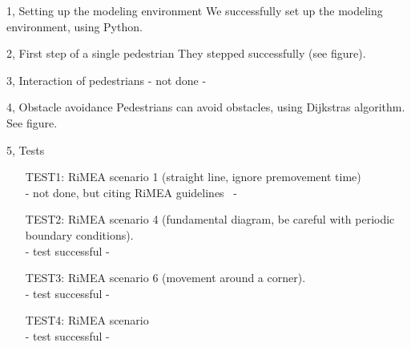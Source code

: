 \documentclass[10pt,a4paper]{article}
\begin{document}
\frontpage

\begin{task}{1, Setting up the modeling environment}
We successfully set up the modeling environment, using Python.
\end{task}

\begin{task}{2, First step of a single pedestrian}
They stepped successfully (see figure).
\end{task}

\begin{task}{3, Interaction of pedestrians}
- not done -
\end{task}
\begin{task}{4, Obstacle avoidance}
Pedestrians can avoid obstacles, using Dijkstras algorithm. See figure.
\end{task}
\begin{task}{5, Tests}
\begin{enumerate}
\item[TEST1:] RiMEA scenario 1 (straight line, ignore premovement time)\\
- not done, but citing RiMEA guidelines~\cite{rimea-2009} -
\item[TEST2:] RiMEA scenario 4 (fundamental diagram, be careful with periodic boundary conditions).\\
- test successful - 
\item[TEST3:] RiMEA scenario 6 (movement around a corner).\\
- test successful - 
\item[TEST4:] RiMEA scenario\\
- test successful - 
\end{enumerate}
\end{task}



\end{document}
